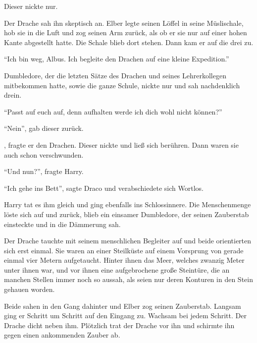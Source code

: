 Dieser nickte nur. 

Der Drache sah ihn skeptisch an. Elber legte seinen Löffel in seine Müslischale, hob sie in die Luft und zog seinen Arm zurück, als ob er sie nur auf einer hohen Kante abgestellt hatte. Die Schale blieb dort stehen. Dann kam er auf die drei zu.



\enquote{Ich bin weg, Albus. Ich begleite den Drachen auf eine kleine Expedition.}

Dumbledore, der die letzten Sätze des Drachen und seines Lehrerkollegen mitbekommen hatte, sowie die ganze Schule, nickte nur und sah nachdenklich drein.

\enquote{Passt auf euch auf, denn aufhalten werde ich dich wohl nicht können?}

\enquote{Nein}, gab dieser zurück.

, fragte er den Drachen. Dieser nickte und ließ sich berühren. Dann waren sie auch schon verschwunden.

\enquote{Und nun?}, fragte Harry.

\enquote{Ich gehe ins Bett}, sagte Draco und verabschiedete sich Wortlos.

Harry tat es ihm gleich und ging ebenfalls ins Schlossinnere. Die Menschenmenge löste sich auf und zurück, blieb ein einsamer Dumbledore, der seinen Zauberstab einsteckte und in die Dämmerung sah.

\trenn

Der Drache tauchte mit seinem menschlichen Begleiter auf und beide orientierten sich erst einmal. Sie waren an einer Steilküste auf einem Vorsprung von gerade einmal vier Metern aufgetaucht. Hinter ihnen das Meer, welches zwanzig Meter unter ihnen war, und vor ihnen eine aufgebrochene große Steintüre, die an manchen Stellen immer noch so aussah, als seien nur deren Konturen in den Stein gehauen worden.

Beide sahen in den Gang dahinter und Elber zog seinen Zauberstab. Langsam ging er Schritt um Schritt auf den Eingang zu. Wachsam bei jedem Schritt. Der Drache dicht neben ihm. Plötzlich trat der Drache vor ihn und schirmte ihn gegen einen ankommenden Zauber ab.

